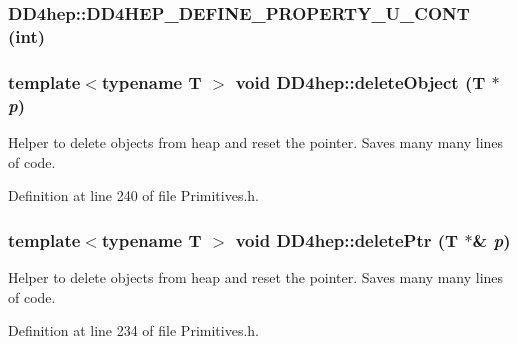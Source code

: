 \label{namespace_d_d4hep_a67e8fcf00713a100e27262956cfd4531}
\hypertarget{namespace_d_d4hep_a46bcfee20ed1f70d5d76b01a58a17a6d}{
\subsubsection[{DD4HEP\_\-DEFINE\_\-PROPERTY\_\-U\_\-CONT}]{\setlength{\rightskip}{0pt plus 5cm}DD4hep::DD4HEP\_\-DEFINE\_\-PROPERTY\_\-U\_\-CONT (int)}}
\label{namespace_d_d4hep_a46bcfee20ed1f70d5d76b01a58a17a6d}
\hypertarget{namespace_d_d4hep_ab0f75632f10a3b7d64ed63ebea03c7a7}{
\subsubsection[{deleteObject}]{\setlength{\rightskip}{0pt plus 5cm}template$<$typename T $>$ void DD4hep::deleteObject ({\bf T} $\ast$ {\em p})}}
\label{namespace_d_d4hep_ab0f75632f10a3b7d64ed63ebea03c7a7}


Helper to delete objects from heap and reset the pointer. Saves many many lines of code. 

Definition at line 240 of file Primitives.h.\hypertarget{namespace_d_d4hep_a2f88a88693a607df41aec66ad3b4ddf5}{
\subsubsection[{deletePtr}]{\setlength{\rightskip}{0pt plus 5cm}template$<$typename T $>$ void DD4hep::deletePtr ({\bf T} $\ast$\& {\em p})}}
\label{namespace_d_d4hep_a2f88a88693a607df41aec66ad3b4ddf5}


Helper to delete objects from heap and reset the pointer. Saves many many lines of code. 

Definition at line 234 of file Primitives.h.

